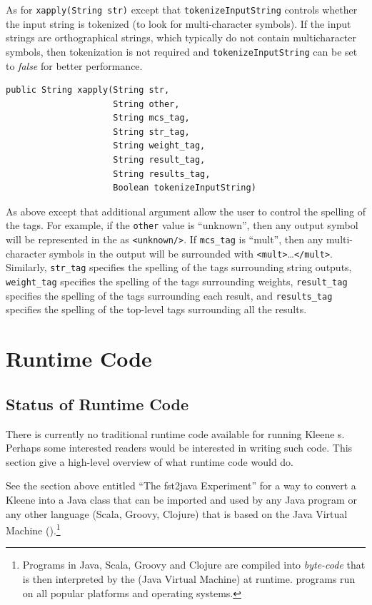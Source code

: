 \noindent
As for \texttt{xapply(String str)} except that \texttt{tokenizeInputString} controls whether
the input string is tokenized (to look for multi-character symbols).  If the input strings are
orthographical strings, which typically do not contain multicharacter symbols, then
tokenization is not required and
\texttt{tokenizeInputString} can be set to \emph{false} for better performance.

\begin{Verbatim}
public String xapply(String str, 
                     String other, 
                     String mcs_tag, 
                     String str_tag, 
                     String weight_tag, 
                     String result_tag, 
                     String results_tag, 
                     Boolean tokenizeInputString)
\end{Verbatim}

\noindent
As above except that additional argument allow the user to control the spelling of the \xml{}
tags.  For example, if the \texttt{other} value is ``unknown'', then any  output
symbol will be represented in the \xml{} as \texttt{<unknown/>}.  If \texttt{mcs\_tag} is ``mult'',
then any multi-character symbols in the output will be surrounded with
\texttt{<mult>}\ldots\texttt{</mult>}.  Similarly, \texttt{str\_tag} specifies the spelling of
the tags surrounding string outputs, \texttt{weight\_tag} specifies the spelling of the tags
surrounding weights, \texttt{result\_tag} specifies the spelling of the tags surrounding each
result, and \texttt{results\_tag} specifies the spelling of the top-level \xml{} tags surrounding
all the results.

\section{Runtime Code}

\subsection{Status of Runtime Code}

There is currently no traditional runtime code available for running Kleene \fsm{}s.  Perhaps
some interested readers would be interested in writing such code.  This section give a
high-level overview of what runtime code would do.

See the section
above entitled ``The fst2java Experiment'' for a way to convert a Kleene \fsm{} into a
Java class that can be imported and used by any Java program or any other language (Scala,
Groovy, Clojure) that is based on the Java Virtual Machine ().\footnote{Programs in Java, Scala, Groovy and Clojure are compiled into
\emph{byte-code} that is then interpreted by the  (Java Virtual Machine) at runtime.   programs run on all popular platforms and operating systems.}

